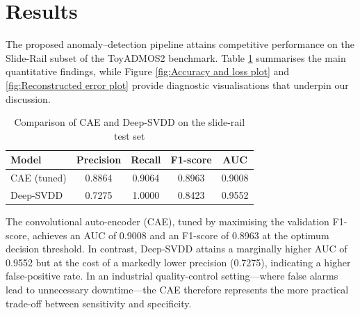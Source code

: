 \section{Results}
\label{sec:Results}


The proposed anomaly–detection pipeline attains competitive performance on the Slide-Rail subset of the ToyADMOS2 benchmark. Table \ref{tab:cae_vs_svdd} summarises the main quantitative findings, while Figure \ref{fig:Accuracy and loss plot} and \ref{fig:Reconstructed error plot} provide diagnostic visualisations that underpin our discussion.



\begin{table}[ht]
    \centering
    \caption{Comparison of CAE and Deep-SVDD on the slide-rail test set}
    \label{tab:cae_vs_svdd}
    \renewcommand{\arraystretch}{1.1}
    \begin{tabular}{lcccc}
        \toprule
        \textbf{Model} & \textbf{Precision} & \textbf{Recall} & \textbf{F1-score} & \textbf{AUC} \\
        \midrule
        CAE (tuned)   & 0.8864 & 0.9064 & 0.8963 & 0.9008 \\
        Deep-SVDD     & 0.7275 & 1.0000 & 0.8423 & 0.9552 \\
        \bottomrule
    \end{tabular}
\end{table}

The convolutional auto-encoder (CAE), tuned by maximising the validation F1-score, achieves an AUC of 0.9008 and an F1-score of 0.8963 at the optimum decision threshold.  In contrast, Deep-SVDD attains a marginally higher AUC of 0.9552 but at the cost of a markedly lower precision (0.7275), indicating a higher false-positive rate.  In an industrial quality-control setting—where false alarms lead to unnecessary downtime—the CAE therefore represents the more practical trade-off between sensitivity and specificity. 


